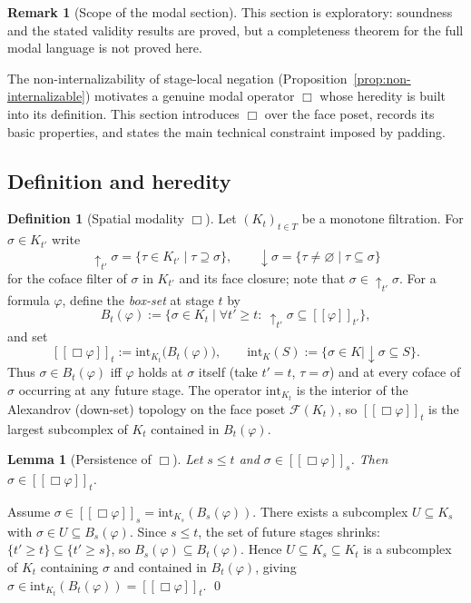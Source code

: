 \documentclass[final,12pt]{elsarticle}
\newcommand{\llbracket}{[\![}
\newcommand{\rrbracket}{]\!]}
\theoremstyle{plain}
\newtheorem{lem}[thm]{Lemma}
\theoremstyle{definition}
\newtheorem{defi}[thm]{Definition}
\newtheorem{rem}[thm]{Remark}
\begin{document}
\begin{rem}[Scope of the modal section]
This section is exploratory: soundness and the stated validity results are
proved, but a completeness theorem for the full modal language is not proved
here.
\end{rem}

The non-internalizability of stage-local negation (Proposition~\ref{prop:non-internalizable})
motivates a genuine modal operator \(\Box\) whose heredity is built into its
definition.  This section introduces \(\Box\) over the face poset, records its
basic properties, and states the main technical constraint imposed by padding.

\subsection{Definition and heredity}

\begin{defi}[Spatial modality \(\Box\)]
\label{def:box}
Let \((K_t)_{t\in T}\) be a monotone filtration. For \(\sigma\in K_{t'}\) write
\[
  \uparrow_{t'}\!\sigma=\{\tau\in K_{t'}\mid \tau\supseteq\sigma\},
  \qquad
  \downarrow\!\sigma=\{\tau\neq\varnothing\mid \tau\subseteq\sigma\}
\]
for the coface filter of \(\sigma\) in \(K_{t'}\) and its face closure; note
that \(\sigma\in\uparrow_{t'}\!\sigma\). For a formula \(\varphi\), define the
\emph{box-set} at stage \(t\) by
\[
  B_t(\varphi):=\{\sigma\in K_t\mid
  \forall t'\geq t:\ \uparrow_{t'}\!\sigma\subseteq
  \llbracket\varphi\rrbracket_{t'}\},
\]
and set
\[
  \llbracket\Box\varphi\rrbracket_t:=
  \mathrm{int}_{K_t}\bigl(B_t(\varphi)\bigr),
  \qquad
  \mathrm{int}_{K}(S):=\{\sigma\in K\mid \downarrow\!\sigma\subseteq S\}.
\]
Thus \(\sigma\in B_t(\varphi)\) iff \(\varphi\) holds at \(\sigma\) itself
(take \(t'=t\), \(\tau=\sigma\)) and at every coface of \(\sigma\) occurring at
any future stage. The operator \(\mathrm{int}_{K_t}\) is the interior of the
Alexandrov (down-set) topology on the face poset \(\mathcal{F}(K_t)\), so
\(\llbracket\Box\varphi\rrbracket_t\) is the largest subcomplex of \(K_t\)
contained in \(B_t(\varphi)\).
\end{defi}

\begin{lem}[Persistence of \(\Box\)]
\label{lem:box-heredity}
Let \(s \leq t\) and \(\sigma \in \llbracket \Box \varphi \rrbracket_s\).
Then \(\sigma \in \llbracket \Box \varphi \rrbracket_t\).
\end{lem}

\proof
Assume \(\sigma \in \llbracket \Box \varphi \rrbracket_s =
\mathrm{int}_{K_s}(B_s(\varphi))\).  There exists a subcomplex
\(U\subseteq K_s\) with \(\sigma\in U\subseteq B_s(\varphi)\).
Since \(s\le t\), the set of future stages shrinks:
\(\{t'\ge t\}\subseteq\{t'\ge s\}\), so
\(B_s(\varphi)\subseteq B_t(\varphi)\).  Hence
\(U\subseteq K_s\subseteq K_t\) is a subcomplex of \(K_t\) containing \(\sigma\) and
contained in \(B_t(\varphi)\), giving
\(\sigma\in\mathrm{int}_{K_t}(B_t(\varphi))=\llbracket\Box\varphi\rrbracket_t\).
\qed
\end{document}
